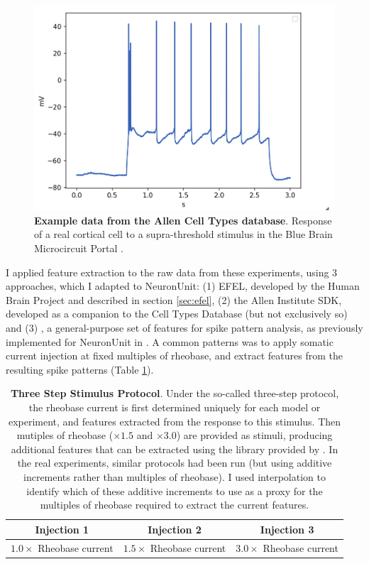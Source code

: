 \begin{figure}  
    \begin{center}
    \includegraphics[width=0.6\linewidth]{figures/multi_spiking_large_bbp}
    \caption[Example from BBP]{\textbf{Example data from the Allen Cell Types database}.
    Response of a real cortical cell to a supra-threshold stimulus in the Blue Brain Microcircuit Portal \citep{toledo}.}
    \label{fig:bbp_trace_adaption_late_spike}
    \end{center}
\end{figure}    

I applied feature extraction to the raw data from these experiments, using 3 approaches, which I adapted to NeuronUnit: (1) EFEL, developed by the Human Brain Project and described in section \ref{sec:efel}, (2) the Allen Institute SDK, developed as a companion to the Cell Types Database (but not exclusively so) and (3) \cite{druckmann2013hierarchical}, a general-purpose set of features for spike pattern analysis, as previously implemented for NeuronUnit in \cite{birgiolas2019towards}.
A common patterns was to apply somatic current injection at fixed multiples of rheobase, and extract features from the resulting spike patterns (Table \ref{table:three-step-stim}).

\begin{table}
\begin{center}
\begin{tabular}{|c|c|c|}
\toprule
Injection 1 & Injection 2 & Injection 3 \\
 \midrule
 $1.0 \times$ Rheobase current & $1.5 \times$ Rheobase current & $3.0 \times$ Rheobase current\\
\bottomrule
\end{tabular}
\caption[Three Step Stimulus Protocol]{\textbf{Three Step Stimulus Protocol}. Under the so-called three-step protocol, the rheobase current is first determined uniquely for each model or experiment, and features extracted from the response to this stimulus.
Then mutiples of rheobase ($\times 1.5$ and $\times 3.0$) are provided as stimuli, producing additional features that can be extracted using the library provided by \cite{EFEL}.
In the real experiments, similar protocols had been run (but using additive increments rather than multiples of rheobase).
I used interpolation to identify which of these additive increments to use as a proxy for the multiples of rheobase required to extract the current features.}
\label{table:three-step-stim}
\end{center}

\end{table}




